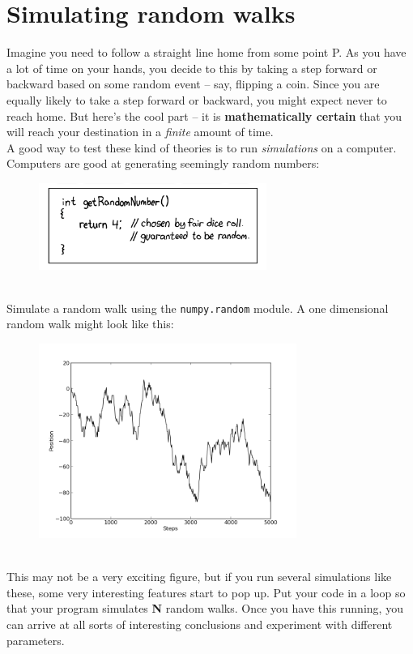 \documentclass{article}
\begin{document}
\section*{Simulating random walks}
Imagine you need to follow a straight line home from some point P. As you have
a lot of time on your hands, you decide to this by taking a step forward or 
backward based on some random event -- say, flipping a coin. Since you are equally
likely to take a step forward or backward, you might expect never to reach home. 
But here's the cool part -- it is \textbf{mathematically certain} that you will reach
your destination in a \emph{finite} amount of time.
\newline \\ A good way to test these kind of theories is to run \emph{simulations}
on a computer. Computers are good at generating seemingly random numbers:
\begin{figure}[h]
\begin{center}
\includegraphics[height=80pt]{../pictures/xkcd_random.png}
\end{center}
\end{figure}
\\ Simulate a random walk using the \texttt{numpy.random} module. A
one dimensional random walk might look like this:
\begin{figure}[h]
\begin{center}
\includegraphics[height=180pt]{../pictures/randomwalk.png}
\end{center}
\end{figure}
\\ This may not be a very exciting figure, but if you run several simulations
like these, some very interesting features start to pop up. Put your code in a
loop so that your program simulates \textbf{N} random walks. Once you have this 
running, you can arrive at all sorts of interesting conclusions and experiment with
different parameters.
\end{document}
